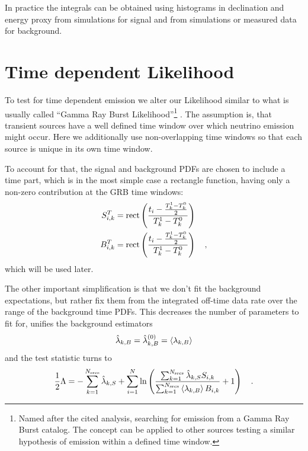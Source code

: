 In practice the integrals can be obtained using histograms in declination and energy proxy from simulations for signal and from simulations or measured data for background.



\section{Time dependent Likelihood}
To test for time dependent emission we alter our Likelihood similar to what is usually called \enquote{Gamma Ray Burst Likelihood}\footnote{Named after the cited analysis, searching for emission from a Gamma Ray Burst catalog. The concept can be applied to other sources testing a similar hypothesis of emission within a defined time window.} .
The assumption is, that transient sources have a well defined time window over which neutrino emission might occur.
Here we additionally use non-overlapping time windows so that each source is unique in its own time window.

To account for that, the signal and background PDFs are chosen to include a time part, which is in the most simple case a rectangle function, having only a non-zero contribution at the GRB time windows:
\begin{align}
  S_{i,k}^T &= \operatorname{rect}\left(\frac{t_i - \frac{T_k^1-T_k^0}{2}}
                              {T_k^1-T_k^0}\right) \\
  B_{i,k}^T &= \operatorname{rect}\left(\frac{t_i - \frac{T_k^1-T_k^0}{2}}
                              {T_k^1-T_k^0}\right)
  \quad\text{,}
\end{align}
which will be used later.

The other important simplification is that we don't fit the background expectations, but rather fix them from the integrated off-time data rate over the range of the background time PDFs.
This decreases the number of parameters to fit for, unifies the background estimators
\begin{equation}
  \hat{\lambda}_{k,B} = \hat{\lambda}_{k,B}^{(0)} = \Braket{\lambda_{k,B}}
\end{equation}
and the test statistic turns to
\begin{equation}
  \frac{1}{2}\Lambda
  = -\sum_{k=1}^{N_\text{srcs}}\hat{\lambda}_{k,S} +
    \sum_{i=1}^N \ln\left(
      \frac{\sum_{k=1}^{N_\text{srcs}}\hat{\lambda}_{k,S} S_{i,k}}
           {\sum_{k=1}^{N_\text{srcs}}\Braket{\lambda_{k,B}} B_{i,k}}
      + 1 \right)
  \quad\text{.}
\end{equation}

